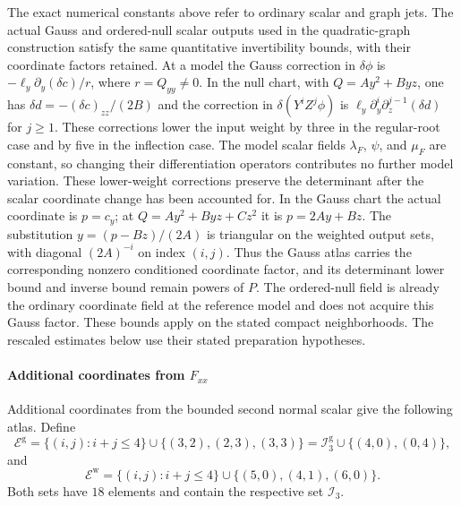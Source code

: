 \documentclass[11pt]{amsart}
\theoremstyle{definition}
\theoremstyle{remark}
\numberwithin{equation}{section}
\begin{document}
The exact numerical constants above refer to ordinary scalar and graph jets. The actual Gauss and ordered-null scalar outputs used in the quadratic-graph construction satisfy the same quantitative invertibility bounds, with their coordinate factors retained. At a model the Gauss correction in $\delta\phi$ is $-\ell_y\partial_y(\delta c)/r$, where $r=Q_{yy}\ne0$. In the null chart, with $Q=Ay^2+Byz$, one has $\delta d=-(\delta c)_{zz}/(2B)$ and the correction in $\delta(Y^iZ^j\phi)$ is $\ell_y\partial_y^i\partial_z^{j-1}(\delta d)$ for $j\ge1$. These corrections lower the input weight by three in the regular-root case and by five in the inflection case. The model scalar fields $\lambda_F$, $\psi$, and $\mu_F$ are constant, so changing their differentiation operators contributes no further model variation. These lower-weight corrections preserve the determinant after the scalar coordinate change has been accounted for. In the Gauss chart the actual coordinate is $p=c_y$; at $Q=Ay^2+Byz+Cz^2$ it is $p=2Ay+Bz$. The substitution $y=(p-Bz)/(2A)$ is triangular on the weighted output sets, with diagonal $(2A)^{-i}$ on index $(i,j)$. Thus the Gauss atlas carries the corresponding nonzero conditioned coordinate factor, and its determinant lower bound and inverse bound remain powers of $P$. The ordered-null field is already the ordinary coordinate field at the reference model and does not acquire this Gauss factor. These bounds apply on the stated compact neighborhoods. The rescaled estimates below use their stated preparation hypotheses.

\paragraph{Additional coordinates from \texorpdfstring{$F_{xx}$}{Fxx}}
Additional coordinates from the bounded second normal scalar give the following atlas. Define
\[
 \mathcal E^{\mathrm g}=\{(i,j):i+j\le4\}\cup\{(3,2),(2,3),(3,3)\}
 =\mathcal I_3^{\mathrm g}\cup\{(4,0),(0,4)\},
\]
and
\[
 \mathcal E^{\mathrm w}=\{(i,j):i+j\le4\}\cup\{(5,0),(4,1),(6,0)\}.
\]
Both sets have $18$ elements and contain the respective set $\mathcal I_3$.
\end{document}
